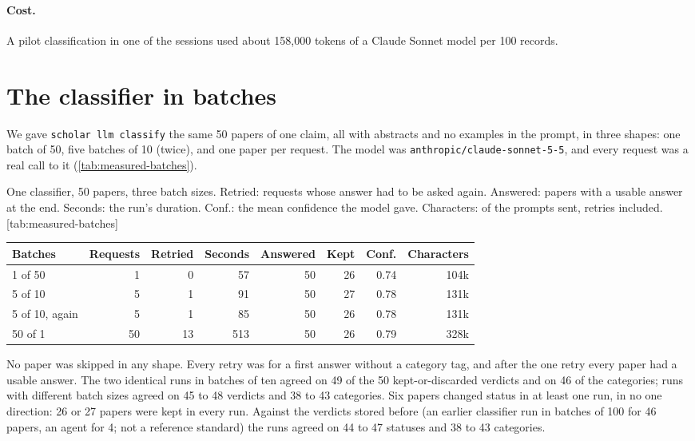 \paragraph{Cost.}
A pilot classification in one of the sessions used about 158,000 tokens
of a Claude Sonnet model per 100 records.

\section{The classifier in batches}
\label{sec:measured-classifier}

We gave \texttt{scholar llm classify} the same 50 papers of one claim, all
with abstracts and no examples in the prompt, in three shapes: one batch
of 50, five batches of 10 (twice), and one paper per request.
The model was \texttt{anthropic/\allowbreak claude-sonnet-5-5}, and every request
was a real call to it (\cref{tab:measured-batches}).

\begin{table}
  \begin{sidecaption}{%
      One classifier, 50 papers, three batch sizes.
      Retried: requests whose answer had to be asked again.
      Answered: papers with a usable answer at the end.
      Seconds: the run's duration.
      Conf.: the mean confidence the model gave.
      Characters: of the prompts sent, retries included.
    }[tab:measured-batches]
    \footnotesize
    \begin{tabular}{@{}lrrrrrrr@{}}
      \toprule
      Batches & Requests & Retried & Seconds & Answered & Kept &
      Conf. & Characters \\
      \midrule
      1 of 50 & 1 & 0 & 57 & 50 & 26 & 0.74 & 104k \\
      5 of 10 & 5 & 1 & 91 & 50 & 27 & 0.78 & 131k \\
      5 of 10, again & 5 & 1 & 85 & 50 & 26 & 0.78 & 131k \\
      50 of 1 & 50 & 13 & 513 & 50 & 26 & 0.79 & 328k \\
      \bottomrule
    \end{tabular}
  \end{sidecaption}
\end{table}

No paper was skipped in any shape.
Every retry was for a first answer without a category tag, and after the
one retry every paper had a usable answer.
The two identical runs in batches of ten agreed on 49 of the 50
kept-or-discarded verdicts and on 46 of the categories; runs with
different batch sizes agreed on 45 to 48 verdicts and 38 to 43
categories.
Six papers changed status in at least one run, in no one direction: 26
or 27 papers were kept in every run.
Against the verdicts stored before (an earlier classifier run in batches
of 100 for 46 papers, an agent for 4; not a reference standard) the runs
agreed on 44 to 47 statuses and 38 to 43 categories.

